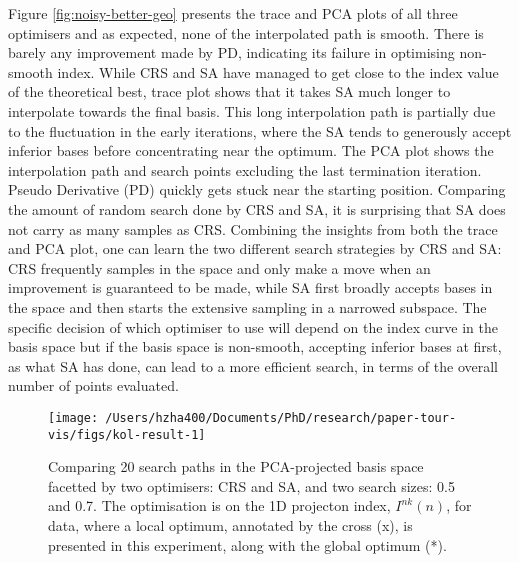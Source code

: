 Figure \ref{fig:noisy-better-geo} presents the trace and PCA plots of
all three optimisers and as expected, none of the interpolated path is
smooth. There is barely any improvement made by PD, indicating its
failure in optimising non-smooth index. While CRS and SA have managed to
get close to the index value of the theoretical best, trace plot shows
that it takes SA much longer to interpolate towards the final basis.
This long interpolation path is partially due to the fluctuation in the
early iterations, where the SA tends to generously accept inferior bases
before concentrating near the optimum. The PCA plot shows the
interpolation path and search points excluding the last termination
iteration. Pseudo Derivative (PD) quickly gets stuck near the starting
position. Comparing the amount of random search done by CRS and SA, it
is surprising that SA does not carry as many samples as CRS. Combining
the insights from both the trace and PCA plot, one can learn the two
different search strategies by CRS and SA: CRS frequently samples in the
space and only make a move when an improvement is guaranteed to be made,
while SA first broadly accepts bases in the space and then starts the
extensive sampling in a narrowed subspace. The specific decision of
which optimiser to use will depend on the index curve in the basis space
but if the basis space is non-smooth, accepting inferior bases at first,
as what SA has done, can lead to a more efficient search, in terms of
the overall number of points evaluated.

\begin{Schunk}
\begin{figure}

{\centering \texttt{[image: /Users/hzha400/Documents/PhD/research/paper-tour-vis/figs/kol-result-1]} 

}

\caption[Comparing 20 search paths in the PCA-projected basis space facetted by two optimisers]{Comparing 20 search paths in the PCA-projected basis space facetted by two optimisers: CRS and SA, and two search sizes: 0.5 and 0.7. The optimisation is on the 1D projecton index, $I^{nk}(n)$, for  data, where a local optimum, annotated by the cross (x), is presented in this experiment, along with the global optimum (*).}\label{fig:kol-result}
\end{figure}
\end{Schunk}

